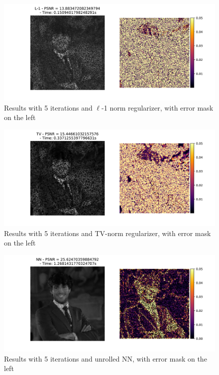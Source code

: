 \documentclass[12pt]{article}
\begin{document}
\begin{figure}[H]
    \centering
    \includegraphics[width=12cm]{hw3/codes/exercise2/results/comparisons/me_comparison_l1_5.pdf}
    \caption{Results with 5 iterations and $\ell$-1 norm regularizer, with error mask on the left}
    \label{fig:comparison-l1-5}
\end{figure}

\begin{figure}[H]
    \centering
    \includegraphics[width=12cm]{hw3/codes/exercise2/results/comparisons/me_comparison_tv_5.pdf}
    \caption{Results with 5 iterations and TV-norm regularizer, with error mask on the left}
    \label{fig:comparison-tv-5}
\end{figure}

\begin{figure}[H]
    \centering
    \includegraphics[width=12cm]{hw3/codes/exercise2/results/comparisons/me_comparison_nn_5.pdf}
    \caption{Results with 5 iterations and unrolled NN, with error mask on the left}
    \label{fig:comparison-nn-5}
\end{figure}
\end{document}
